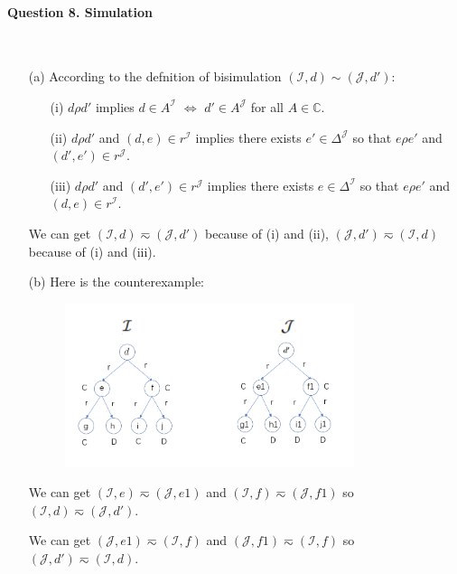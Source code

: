 \documentclass[12pt]{article}
\def \J {\mathcal{J}}
\def \I {\mathcal{I}}
\begin{document}
    \newpage
    \paragraph{Question 8. Simulation}~{}
    \\

    \begin{enumerate}
        \item [(a)]
        According to the defnition of bisimulation $(\I,d) \sim (\J,d')$: \par
        \begin{enumerate}
            \item [(i)] $d\rho d'$ implies $d \in A^{\I}$ $\Leftrightarrow$ $d' \in A^{\J}$ for all $A \in \mathbb{C}$.
            \item [(ii)] $d\rho d'$ and $(d,e) \in r^{\I}$ implies there exists $e' \in \Delta^{\J}$ so that $e\rho e'$ and $(d',e') \in r^{\J}$.
            \item [(iii)] $d\rho d'$ and $(d',e') \in r^{\J}$ implies there exists $e \in \Delta^{\I}$ so that $e\rho e'$ and $(d,e) \in r^{\I}$.
        \end{enumerate}
        We can get $(\I,d) \eqsim (\J,d')$ because of (i) and (ii), $(\J,d') \eqsim (\I,d)$ because of (i) and (iii).
        \item [(b)]
        Here is the counterexample: \par
        \begin{figure}[htbp]
            \centering 
            \includegraphics[width=0.8\textwidth,height=0.5\textwidth]{HW8_B.png}
        \end{figure} \par
        We can get $(\I,e) \eqsim (\J,e1)$ and $(\I,f) \eqsim (\J, f1)$ so
        $(\I,d) \eqsim (\J,d')$. \par
        We can get $(\J,e1) \eqsim (\I, f)$ and $(\J, f1) \eqsim (\I, f)$ so $(\J,d') \eqsim (\I,d)$. \par

\end{enumerate}
\end{document}
